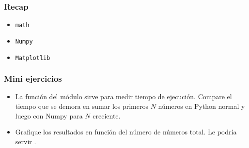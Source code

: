 \documentclass[14pt,aspectratio=169,xcolor=dvipsnames]{beamer}
\begin{document}
\begin{frame}\frametitle{Recap}
    \begin{itemize}
        \item \texttt{math}
        \item \texttt{Numpy}
        \item \texttt{Matplotlib}
    \end{itemize}
\end{frame}
\begin{frame}
    \maketitle
\end{frame}
\begin{frame}[fragile]\frametitle{Mini ejercicios}
    \begin{itemize}
        \item La función  del módulo  sirve para medir tiempo de ejecución. Compare el tiempo que se demora en sumar los primeros $N$ números en Python normal y luego con Numpy para $N$ creciente.
        \item Grafique los resultados en función del número de números total. Le podría servir . 
    \end{itemize}
\end{frame}
\end{document}
